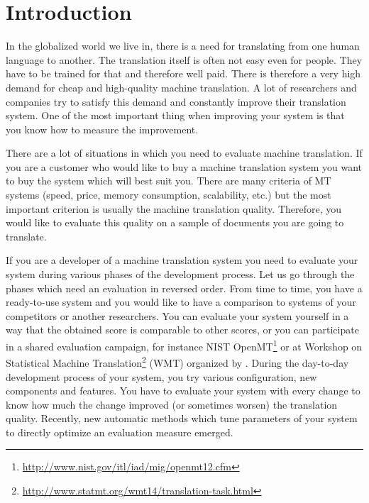 \chapter{Introduction}

\begin{comment}
The field of machine translation (MT) experienced a very fast development over
the past twenty years. It was primarily caused by the growing power of
computers allowing researchers to start using statistical methods. These methods
require a lot of computer resources to both learn statistics from data and then
to use them in translation.
\end{comment}

In the globalized world we live in, there is a need for translating from one
human language to another. The translation itself is often not easy even for
people. They have to be trained for that and therefore well paid. There is
therefore a very high demand for cheap and high-quality machine translation. A
lot of researchers and companies try to satisfy this demand and constantly
improve their translation system. One of the most important thing when improving
your system is that you know how to measure the improvement.

There are a lot of situations in which you need to evaluate machine
translation. If you are a customer who would like to buy a machine translation
system you want to buy the system which will best suit you. There are many
criteria of MT systems (speed, price, memory consumption, scalability, etc.) but
the most important criterion is usually the machine translation quality.
Therefore, you would like to evaluate this quality on a sample of documents you
are going to translate.

If you are a developer of a machine translation system you need to evaluate
your system during various phases of the development process. Let us go through
the phases which need an evaluation in reversed order. From time to time, you
have a ready-to-use system and you would like to have a comparison to systems
of your competitors or another researchers. You can evaluate your system
yourself in a way that the obtained score is comparable to other scores, or you
can participate in a shared evaluation campaign, for instance NIST
OpenMT\footnote{\url{http://www.nist.gov/itl/iad/mig/openmt12.cfm}} or at
Workshop on Statistical Machine
Translation\footnote{\url{http://www.statmt.org/wmt14/translation-task.html}}
(WMT) organized by .  During the day-to-day
development process of your system, you try various configuration, new
components and features. You have to evaluate your system with every change to
know how much the change improved (or sometimes worsen) the translation
quality. Recently, new automatic methods which tune parameters of your system
to directly optimize an evaluation measure emerged.

